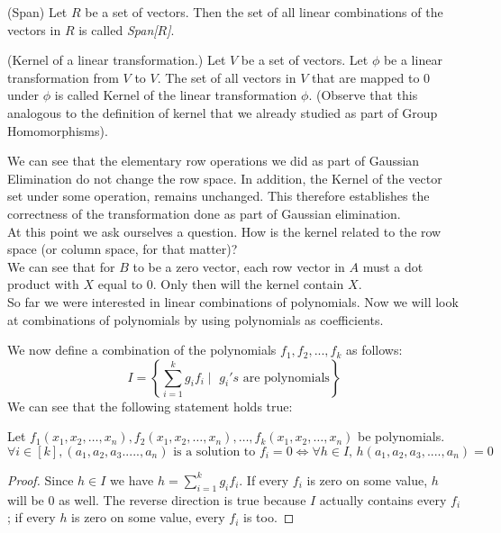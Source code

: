 \begin{definition} (Span) 
Let $R$ be a set of vectors. Then the set of all linear combinations of the vectors in $R$ is called {\em Span[$R$]}.
\end{definition}

\begin{definition} (Kernel of a linear transformation.)
Let $V$ be a set of vectors. Let $\phi$ be a linear transformation from $V$ to $V$. The set of all vectors in $V$ that are mapped to $0$ under $\phi$ is called Kernel of the linear transformation $\phi$. (Observe that this analogous to the definition of kernel that we already studied as part of Group Homomorphisms).
\end{definition}

We can see that the elementary row operations we did as part of Gaussian Elimination do not change the row space. In addition, the Kernel of the vector set under some operation, remains unchanged. This therefore establishes the correctness of the transformation done as part of Gaussian elimination.\\
At this point we ask ourselves a question. How is the kernel related to the row space (or column space, for that matter)?\\


We can see that for $B$ to be a zero vector, each row vector in $A$ must a dot product with $X$ equal to 0. Only then will the kernel contain $X$.\\


So far we were interested in linear combinations of polynomials. Now we will look at combinations of polynomials by using polynomials as coefficients.


We now define a combination of the polynomials $f_1,f_2,...,f_k$ as follows:\\
\[
I = \left\lbrace\sum\limits_{i=1}^{k} g_{i}f_{i}\mid \text{~}g_{i}'s \text{~are polynomials}\right\rbrace
\]
We can see that the following statement holds true:
\begin{lemma}
Let $f_1(x_1, x_2, \ldots, x_n),f_2(x_1, x_2, \ldots, x_n),\ldots,
f_k (x_1, x_2, \ldots, x_n)$ be polynomials.
\begin{equation}
 \forall i\in[k], (a_1,a_2,a_3.....,a_n)\text{~is a solution to~}f_i=0 \Leftrightarrow \forall h \in I \text{,~}h(a_1,a_2,a_3,....,a_n)=0
\end{equation}
\end{lemma}
\begin{proof} 
Since $h\in I$ we have $h=\sum\limits_{i=1}^{k} g_{i}f_{i}$. If every $f_i$ is zero on some value, $h$ will be 0 as well. The reverse direction is true because $I$ actually contains every $f_i$; if every $h$ is zero on some value, every $f_i$ is too.
\end{proof}

